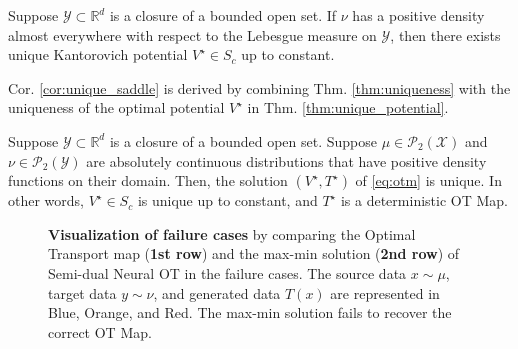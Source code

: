 \begin{theorem} \label{thm:unique_potential}
    Suppose $\mathcal{Y} \subset \mathbb{R}^d$ is a closure of a bounded open set. If $\nu$ has a positive density almost everywhere with respect to the Lebesgue measure on $\mathcal{Y}$, then there exists unique Kantorovich potential $V^\star \in S_c$ up to constant.
\end{theorem}

Cor. \ref{cor:unique_saddle} is derived by combining Thm. \ref{thm:uniqueness} with the uniqueness of the optimal potential $V^{\star}$ in Thm. \ref{thm:unique_potential}.

\begin{corollary} \label{cor:unique_saddle}
     Suppose $\mathcal{Y} \subset \mathbb{R}^d$ is a closure of a bounded open set. 
    Suppose $\mu \in \mathcal{P}_2(\mathcal{X})$ and $\nu\in \mathcal{P}_2 (\mathcal{Y})$ are absolutely continuous distributions that have positive density functions on their domain. Then, the solution $(V^\star, T^\star)$ of \eqref{eq:otm} is unique. In other words, $V^\star\in S_c$ is unique up to constant, and $T^\star$ is a deterministic OT Map.
\end{corollary}
\vspace{-5pt}

\begin{figure*}
    \centering
    \quad
    \quad
    \quad
     \vspace{-10pt}
    \caption{\textbf{Visualization of failure cases} by comparing the Optimal Transport map (\textbf{1st row}) and the max-min solution (\textbf{2nd row}) of Semi-dual Neural OT in the failure cases. The source data $x \sim \mu$, target data $y \sim \nu$, and generated data $T(x)$ are represented in Blue, Orange, and Red. The max-min solution fails to recover the correct OT Map.}
    \label{fig:fail_case}
    \vspace{-10pt}
\end{figure*}
        


